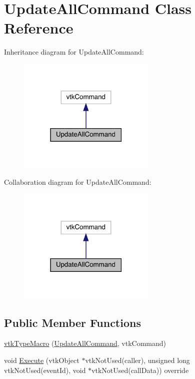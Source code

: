\hypertarget{class_update_all_command}{}\section{Update\+All\+Command Class Reference}
\label{class_update_all_command}


Inheritance diagram for Update\+All\+Command\+:\nopagebreak
\begin{figure}[H]
\begin{center}
\leavevmode
\includegraphics[width=186pt]{class_update_all_command__inherit__graph}
\end{center}
\end{figure}


Collaboration diagram for Update\+All\+Command\+:\nopagebreak
\begin{figure}[H]
\begin{center}
\leavevmode
\includegraphics[width=186pt]{class_update_all_command__coll__graph}
\end{center}
\end{figure}
\subsection*{Public Member Functions}
\begin{DoxyCompactItemize}
\item 
\hyperlink{class_update_all_command_a228565b2a2306d425dc7eb3cda4d39a4}{vtk\+Type\+Macro} (\hyperlink{class_update_all_command}{Update\+All\+Command}, vtk\+Command)
\item 
void \hyperlink{class_update_all_command_aa836cd5d538016289656d8118da879c5}{Execute} (vtk\+Object $\ast$vtk\+Not\+Used(caller), unsigned long vtk\+Not\+Used(event\+Id), void $\ast$vtk\+Not\+Used(call\+Data)) override
\end{DoxyCompactItemize}
